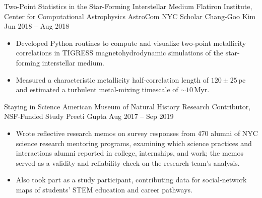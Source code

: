 \vspace{0.2em}

\researchentry
  {Two-Point Statistics in the Star-Forming Interstellar Medium}
  {Flatiron Institute, Center for Computational Astrophysics}
  {AstroCom NYC Scholar}
  {Chang-Goo Kim}
  {Jun 2018 -- Aug 2018}
  {}
\begin{itemize}[
  leftmargin=1em,
  label={--},
  itemsep=2pt,
  topsep=0pt,
  parsep=0pt,
  partopsep=0pt
]
  \item Developed Python routines to compute and visualize two-point
  metallicity correlations in TIGRESS magneto\-hydrodynamic simulations of the
  star-forming interstellar medium.

  \item Measured a characteristic metallicity half-correlation length of
  $120\pm25\,\mathrm{pc}$ and estimated a turbulent metal-mixing timescale of
  $\sim10\,\mathrm{Myr}$.
\end{itemize}

\vspace{0.2em}

\researchentry
  {Staying in Science}
  {American Museum of Natural History}
  {Research Contributor, NSF-Funded Study}
  {Preeti Gupta}
  {Aug 2017 -- Sep 2019}
  {}
\begin{itemize}[
  leftmargin=1em,
  label={--},
  itemsep=2pt,
  topsep=0pt,
  parsep=0pt,
  partopsep=0pt
]
  \item Wrote reflective research memos on survey responses from 470 alumni of
  NYC science research mentoring programs, examining which science practices
  and interactions alumni reported in college, internships, and work; the
  memos served as a validity and reliability check on the research team's
  analysis.

  \item Also took part as a study participant, contributing data for
  social-network maps of students' STEM education and career pathways.
\end{itemize}
